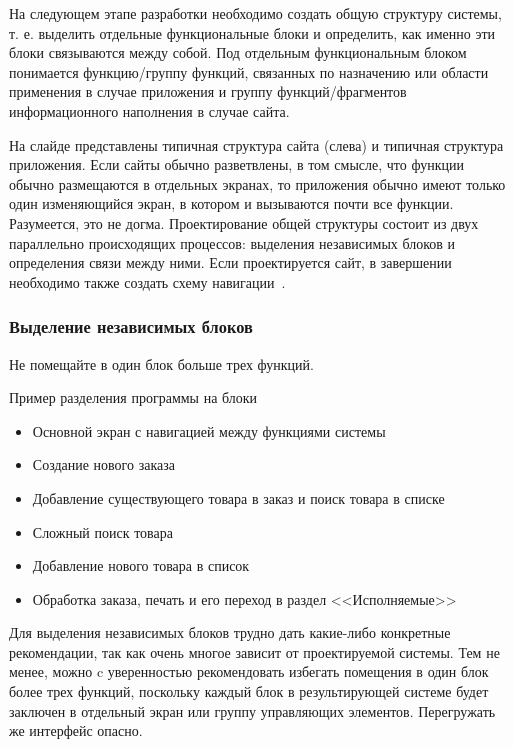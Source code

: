 \documentclass{../industrial-development}
\begin{document}
\lecturenotes

На следующем этапе разработки необходимо создать общую структуру системы, т. е. выделить отдельные функциональные блоки и определить, как именно эти блоки связываются между собой. Под отдельным функциональным блоком понимается функцию/группу функций, связанных по назначению или области применения в случае приложения и группу функций/фрагментов информационного наполнения в случае сайта.

На слайде представлены типичная структура сайта (слева) и типичная структура приложения. Если сайты обычно разветвлены, в том смысле, что функции обычно размещаются в отдельных экранах, то приложения обычно имеют только один изменяющийся экран, в котором и вызываются почти все функции. Разумеется, это не догма. Проектирование общей структуры состоит из двух параллельно происходящих процессов: выделения независимых блоков и определения связи между ними. Если проектируется сайт, в завершении необходимо также создать схему навигации~\cite[с.~117]{Golovach}.

\begin{frame} \frametitle{Выделение независимых блоков}
 \begin{block}{}
  Не помещайте в один блок больше трех функций.
 \end{block}

 \begin{block}{Пример разделения программы на блоки}
  \begin{itemize}
   \item Основной экран с навигацией между функциями системы
   \item Создание нового заказа
   \item Добавление существующего товара в заказ и поиск товара в списке
   \item Сложный поиск товара
   \item Добавление нового товара в список
   \item Обработка заказа, печать и его переход в раздел <<Исполняемые>>
  \end{itemize}
 \end{block}
\end{frame}

\lecturenotes

Для выделения независимых блоков трудно дать какие-либо конкретные рекомендации, так как очень многое зависит от проектируемой системы. Тем не менее, можно c уверенностью рекомендовать избегать помещения в один блок более трех функций, поскольку каждый блок в результирующей системе будет заключен в отдельный экран или группу управляющих элементов. Перегружать же интерфейс опасно.
\end{document}
